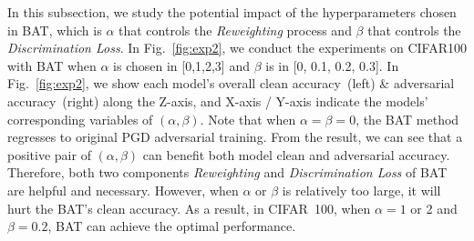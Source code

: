 In this subsection, we study the potential impact of the hyperparameters chosen in BAT, which is $\alpha$ that controls the \textit{Reweighting} process and $\beta$ that controls the \textit{Discrimination Loss}. 
In Fig.~\ref{fig:exp2}, we conduct the experiments on CIFAR100 with BAT when $\alpha$ is chosen in [0,1,2,3] and $\beta$ is in [0, 0.1, 0.2, 0.3].
In Fig.~\ref{fig:exp2}, we show each model's overall clean accuracy~(left) \& adversarial accuracy~(right) along the Z-axis, and X-axis / Y-axis indicate the models' corresponding variables of $(\alpha,\beta)$. Note that when $\alpha=\beta=0$, the BAT method regresses to original PGD adversarial training. From the result, we can see that a positive pair of $(\alpha,\beta)$ can benefit both model clean and adversarial accuracy. Therefore, both two components \textit{Reweighting} and \textit{Discrimination Loss} of BAT are helpful and necessary. However, when $\alpha$ or $\beta$ is relatively too large, it will hurt the BAT's clean accuracy. As a result, in CIFAR~100, when $\alpha=1$ or 2 and $\beta= 0.2$, BAT can achieve the optimal performance.

